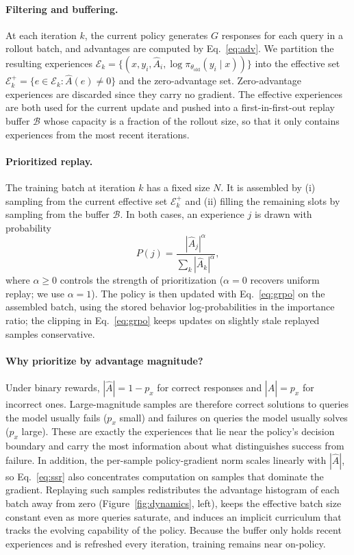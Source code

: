 \documentclass{article}
\begin{document}
\paragraph{Filtering and buffering.} At each iteration $k$, the current policy generates $G$ responses for each query in a rollout batch, and advantages are computed by Eq.~\eqref{eq:adv}. We partition the resulting experiences $\mathcal{E}_k=\{(x,y_i,\hat{A}_i,\log\pi_{\theta_\text{old}}(y_i\mid x))\}$ into the effective set $\mathcal{E}_k^{+}=\{e\in\mathcal{E}_k:\hat{A}(e)\neq 0\}$ and the zero-advantage set. Zero-advantage experiences are discarded since they carry no gradient. The effective experiences are both used for the current update and pushed into a first-in-first-out replay buffer $\mathcal{B}$ whose capacity is a fraction of the rollout size, so that it only contains experiences from the most recent iterations.

\paragraph{Prioritized replay.} The training batch at iteration $k$ has a fixed size $N$. It is assembled by (i) sampling from the current effective set $\mathcal{E}_k^{+}$ and (ii) filling the remaining slots by sampling from the buffer $\mathcal{B}$. In both cases, an experience $j$ is drawn with probability
\begin{equation}
    P(j) = \frac{|\hat{A}_j|^{\alpha}}{\sum_{k}|\hat{A}_k|^{\alpha}},
    \label{eq:ssr}
\end{equation}
where $\alpha\ge 0$ controls the strength of prioritization ($\alpha=0$ recovers uniform replay; we use $\alpha=1$). The policy is then updated with Eq.~\eqref{eq:grpo} on the assembled batch, using the stored behavior log-probabilities in the importance ratio; the clipping in Eq.~\eqref{eq:grpo} keeps updates on slightly stale replayed samples conservative.

\paragraph{Why prioritize by advantage magnitude?} Under binary rewards, $|\hat{A}|=1-p_x$ for correct responses and $|\hat{A}|=p_x$ for incorrect ones. Large-magnitude samples are therefore correct solutions to queries the model usually fails ($p_x$ small) and failures on queries the model usually solves ($p_x$ large). These are exactly the experiences that lie near the policy's decision boundary and carry the most information about what distinguishes success from failure. In addition, the per-sample policy-gradient norm scales linearly with $|\hat{A}|$, so Eq.~\eqref{eq:ssr} also concentrates computation on samples that dominate the gradient. Replaying such samples redistributes the advantage histogram of each batch away from zero (Figure~\ref{fig:dynamics}, left), keeps the effective batch size constant even as more queries saturate, and induces an implicit curriculum that tracks the evolving capability of the policy. Because the buffer only holds recent experiences and is refreshed every iteration, training remains near on-policy.
\end{document}
